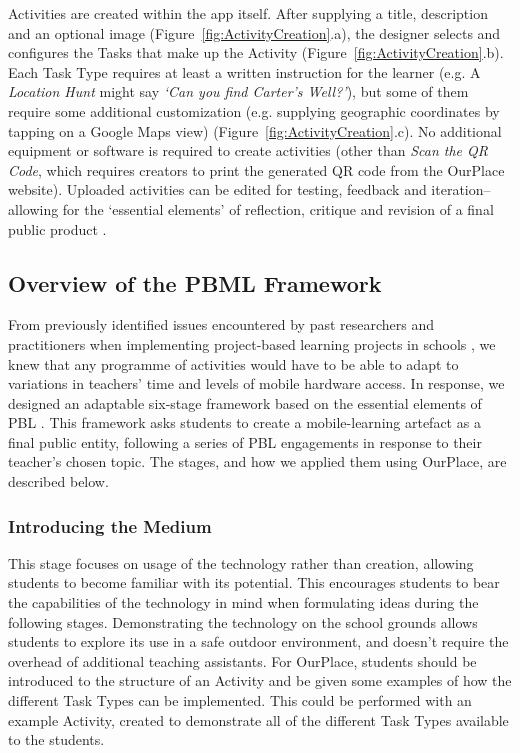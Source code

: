 \documentclass[,hyphens]{sigchi}
\begin{document}
Activities are created within the app itself. After supplying a title, description and an optional image (Figure~\ref{fig:ActivityCreation}.a), the designer selects and configures the Tasks that make up the Activity (Figure~\ref{fig:ActivityCreation}.b). Each Task Type requires at least a written instruction for the learner (e.g. A \textit{Location Hunt} might say \textit{`Can you find Carter's Well?'}), but some of them require some additional customization (e.g. supplying geographic coordinates by tapping on a Google Maps view) (Figure~\ref{fig:ActivityCreation}.c). No additional equipment or software is required to create activities (other than \textit{Scan the QR Code}, which requires creators to print the generated QR code from the OurPlace website). Uploaded activities can be edited for testing, feedback and iteration--allowing for the `essential elements' of reflection, critique and revision of a final public product \cite{Larmer2015}. 

\subsection{Overview of the PBML Framework}

From previously identified issues encountered by past researchers and practitioners when implementing project-based learning projects in schools \cite{Blumenfeld1991, Krajcik2006, InnovationUnit2016, TheEducationEndowmentFoundation2016}, we knew that any programme of activities would have to be able to adapt to variations in teachers' time and levels of mobile hardware access. In response, we designed an adaptable six-stage framework based on the essential elements of PBL \cite{Larmer2015}. This framework asks students to create a mobile-learning artefact as a final public entity, following a series of PBL engagements in response to their teacher's chosen topic. The stages, and how we applied them using OurPlace, are described below.

\subsubsection{Introducing the Medium}
This stage focuses on usage of the technology rather than creation, allowing students to become familiar with its potential. This encourages students to bear the capabilities of the technology in mind when formulating ideas during the following stages. Demonstrating the technology on the school grounds allows students to explore its use in a safe outdoor environment, and doesn't require the overhead of additional teaching assistants. For OurPlace, students should be introduced to the structure of an Activity and be given some examples of how the different Task Types can be implemented. This could be performed with an example Activity, created to demonstrate all of the different Task Types available to the students.
\end{document}
